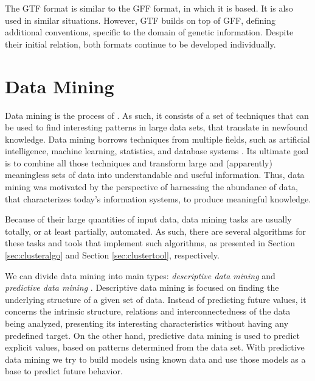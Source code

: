 The GTF format is similar to the GFF format, in which it is based. It is also
used in similar situations. However, GTF builds on top of GFF, defining
additional conventions, specific to the domain of genetic information. Despite
their initial relation, both formats continue to be developed individually.

\section{Data Mining}\label{sec:mlearning}


Data mining is the process of  \cite[p. 5]{han2006data}. As such, it consists of a
set of techniques that can be used to find interesting patterns in large data
sets, that translate in newfound knowledge. Data mining borrows techniques from
multiple fields, such as artificial intelligence, machine learning, statistics,
and database systems \cite{Chakrabarti2012}. Its ultimate goal is to combine all
those techniques and transform large and (apparently) meaningless sets of data
into understandable and useful information. Thus, data mining was motivated by
the perspective of harnessing the abundance of data, that characterizes today's
information systems, to produce meaningful knowledge.

Because of their large quantities of input data, data mining tasks are usually
totally, or at least partially, automated. As such, there are several algorithms
for these tasks and tools that implement such algorithms, as presented in
Section \ref{sec:clusteralgo} and Section \ref{sec:clustertool}, respectively.

We can divide data mining into main types: \emph{descriptive data mining} and
\emph{predictive data mining} \cite{Fayyad1996}. Descriptive data mining is
focused on finding the underlying structure of a given set of data. Instead of
predicting future values, it concerns the intrinsic structure, relations and
interconnectedness of the data being analyzed, presenting its interesting
characteristics without having any predefined target. On the other hand,
predictive data mining is used to predict explicit values, based on patterns
determined from the data set. With predictive data mining we try to build models
using known data and use those models as a base to predict future behavior.

